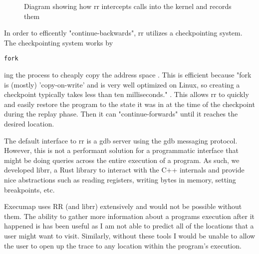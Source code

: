\begin{figure}
\centering
{}
\caption{Diagram showing how rr intercepts calls into the kernel and records them}
\end{figure}
    In order to efficently "continue-backwards", rr utilizes a checkpointing system. The checkpointing system works by \begin{verbatim}fork\end{verbatim}ing the process to cheaply copy the address space \cite[p.~15]{rr}. This is efficient because "fork is (mostly) 'copy-on-write' and is very well optimized on Linux, so creating a checkpoint typically takes less than ten milliseconds." \cite[p.~15]{rr}. This allows rr to quickly and easily restore the program to the state it was in at the time of the checkpoint during the replay phase. Then it can "continue-forwards" until it reaches the desired location.

The default interface to rr is a gdb server using the gdb messaging protocol. However, this is not a performant solution for a programmatic interface that might be doing queries across the entire execution of a program. As such, we developed librr, a Rust library to interact with the C++ internals and provide nice abstractions such as reading registers, writing bytes in memory, setting breakpoints, etc. 

Execumap uses RR (and librr) extensively and would not be possible without them. The ability to gather more information about a programs execution after it happened is has been useful as I am not able to predict all of the locations that a user might want to visit. Similarly, without these tools I would be unable to allow the user to open up the trace to any location within the program's execution.


